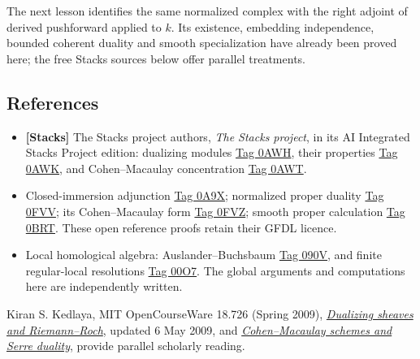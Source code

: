 \documentclass[11pt]{article}
\providecommand{\tightlist}{\setlength{\itemsep}{0pt}\setlength{\parskip}{0pt}}
\begin{document}
The next lesson identifies the same normalized complex with the right
adjoint of derived pushforward applied to \(k\). Its existence,
embedding independence, bounded coherent duality and smooth
specialization have already been proved here; the free Stacks sources
below offer parallel treatments.

\subsection{References}\label{references}

\begin{itemize}
\tightlist
\item
  \textbf{{[}Stacks{]}} The Stacks project authors, \emph{The Stacks
  project}, in its AI Integrated Stacks Project edition: dualizing
  modules
  \href{https://kokunoyumeto.github.io/stacks-zh-hans-cn/en/duality.html\#duality-section-dualizing-module}{Tag
  0AWH}, their properties
  \href{https://kokunoyumeto.github.io/stacks-zh-hans-cn/en/duality.html\#duality-lemma-dualizing-module}{Tag
  0AWK}, and Cohen--Macaulay concentration
  \href{https://kokunoyumeto.github.io/stacks-zh-hans-cn/en/duality.html\#duality-lemma-dualizing-module-CM-scheme}{Tag
  0AWT}.
\item
  Closed-immersion adjunction
  \href{https://kokunoyumeto.github.io/stacks-zh-hans-cn/en/duality.html\#duality-lemma-twisted-inverse-image-closed}{Tag
  0A9X}; normalized proper duality
  \href{https://kokunoyumeto.github.io/stacks-zh-hans-cn/en/duality.html\#duality-lemma-duality-proper-over-field}{Tag
  0FVV}; its Cohen--Macaulay form
  \href{https://kokunoyumeto.github.io/stacks-zh-hans-cn/en/duality.html\#duality-lemma-duality-proper-over-field-CM}{Tag
  0FVZ}; smooth proper calculation
  \href{https://kokunoyumeto.github.io/stacks-zh-hans-cn/en/duality.html\#duality-lemma-smooth-proper}{Tag
  0BRT}. These open reference proofs retain their GFDL licence.
\item
  Local homological algebra: Auslander--Buchsbaum
  \href{https://kokunoyumeto.github.io/stacks-zh-hans-cn/en/algebra.html\#algebra-proposition-Auslander-Buchsbaum}{Tag
  090V}, and finite regular-local resolutions
  \href{https://kokunoyumeto.github.io/stacks-zh-hans-cn/en/algebra.html\#algebra-proposition-regular-finite-gl-dim}{Tag
  00O7}. The global arguments and computations here are independently
  written.
\end{itemize}

Kiran S. Kedlaya, MIT OpenCourseWare 18.726 (Spring 2009),
\href{https://ocw.mit.edu/courses/18-726-algebraic-geometry-spring-2009/be1fa559e68ba14f8cefb4484bc54de1_MIT18_726s09_lec24_dualizing.pdf}{\emph{Dualizing
sheaves and Riemann--Roch}}, updated 6 May 2009, and
\href{https://ocw.mit.edu/courses/18-726-algebraic-geometry-spring-2009/0ea66a0bdcf4f8127c826882531f1642_MIT18_726s09_lec25_serre_dual.pdf}{\emph{Cohen--Macaulay
schemes and Serre duality}}, provide parallel scholarly reading.
\end{document}
